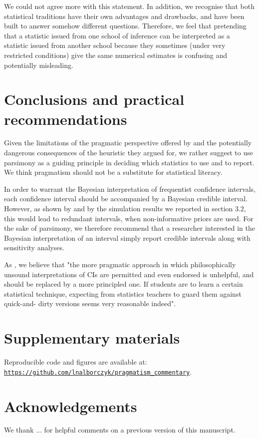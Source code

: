 \documentclass[a4paper,man,natbib,floatsintext,donotrepeattitle]{apa6}
\begin{document}
We could not agree more with this statement. In addition, we recognise that both statistical traditions have their own advantages and drawbacks, and have been built to answer somehow different questions. Therefore, we feel that pretending that a statistic issued from one school of inference can be interpreted as a statistic issued from another school because they sometimes (under very restricted conditions) give the same numerical estimates is confusing and potentially misleading.

\section{Conclusions and practical recommendations}

Given the limitations of the pragmatic perspective offered by \cite{albers_credible_2018} and the potentially dangerous consequences of the heuristic they argued for, we rather suggest to use parsimony as a guiding principle in deciding which statistics to use and to report. We think pragmatism should not be a substitute for statistical literacy.

In order to warrant the Bayesian interpretation of frequentist confidence intervals, each confidence interval should be accompanied by a Bayesian credible interval. However, as shown by \cite{albers_credible_2018} and by the simulation results we reported in section 3.2, this would lead to redundant intervals, when non-informative priors are used. For the sake of parsimony, we therefore recommend that a researcher interested in the Bayesian interpretation of an interval simply report credible intervals along with sensitivity analyses.

As \cite{hoekstra_improving_2018}, we believe that "the more pragmatic approach in which philosophically unsound interpretations of CIs are permitted and even endorsed is unhelpful, and should be replaced by a more principled one. If students are to learn a certain statistical technique, expecting from statistics teachers to guard them against quick-and- dirty versions seems very reasonable indeed".

\section{Supplementary materials}

Reproducible code and figures are available at: \href{https://github.com/lnalborczyk/pragmatism_commentary}{\nolinkurl{https://github.com/lnalborczyk/pragmatism_commentary}}.

\section{Acknowledgements}

We thank ... for helpful comments on a previous version of this manuscript.




  
\end{document}
